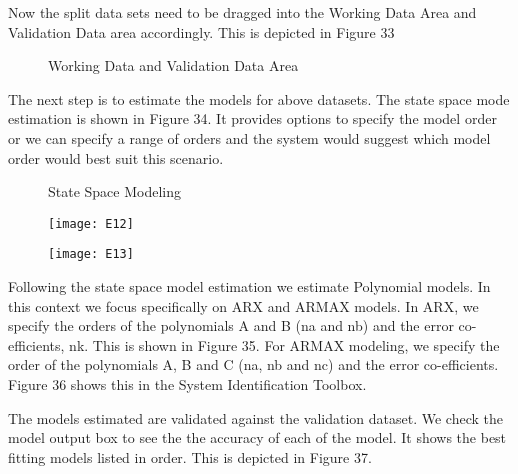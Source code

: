 \documentclass[article,type=msc,colorback,12pt,accentcolor=tud7b,table]{tudthesis}
\begin{document}
	Now the split data sets need to be dragged into the Working Data Area and Validation Data area accordingly. This is depicted in Figure 33 
	
	    \begin{figure}[H]
	    	\begin{center}
	    		\makebox[\textwidth]{\texttt{[image: E10]}}
	    	\end{center}
	    	\caption{Working Data and Validation Data Area}
	    \end{figure}
	
	The next step is to estimate the models for above datasets. The state space mode estimation is shown in Figure 34. It provides options to specify the model order or we can specify a range of orders and the system would suggest which model order would best suit this scenario.
	
	    \begin{figure}[H]
	    	\begin{center}
	    		\makebox[\textwidth]{\texttt{[image: E11]}}
	    	\end{center}
	    	\caption{State Space Modeling}
	    \end{figure}
	
	\begin{figure}[H]
		\centering
		\begin{minipage}{.5\textwidth}
			\centering
			\texttt{[image: E12]}
			
		\end{minipage}%
		\begin{minipage}{.5\textwidth}
			\centering
			\texttt{[image: E13]}
		\end{minipage}
	\end{figure}
	
	Following the state space model estimation we estimate Polynomial models. In this context we focus specifically on ARX and ARMAX models. In ARX, we specify the orders of the polynomials A and B (na and nb) and the error co-efficients, nk. This is shown in Figure 35. 	For ARMAX modeling, we specify the order of the polynomials A, B and C (na, nb and nc) and the error co-efficients. Figure 36 shows this in the System Identification Toolbox.

	The models estimated are validated against the validation dataset. We check the model output box to see the the accuracy of each of the model. It shows the best fitting models listed in order. This is depicted in Figure 37.
	
\end{document}
